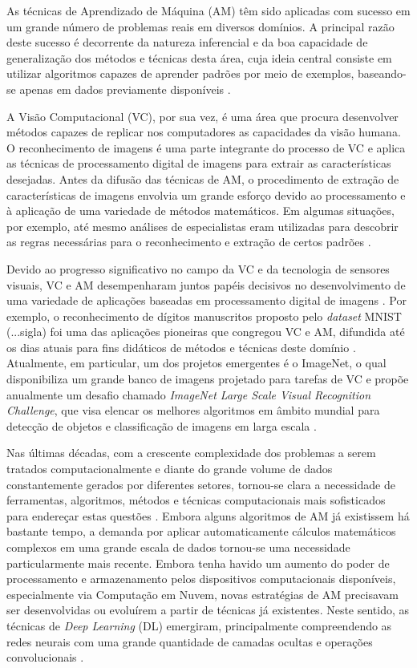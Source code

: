 As técnicas de Aprendizado de Máquina (AM) têm sido aplicadas com sucesso em um grande número de problemas reais em diversos domínios. A principal razão deste sucesso é decorrente da natureza inferencial e da boa capacidade de generalização dos métodos e técnicas desta área, cuja ideia central consiste em utilizar algoritmos capazes de aprender padrões por meio de exemplos, baseando-se apenas em dados previamente disponíveis \cite{ref:faceli,ref:gulli}.

A Visão Computacional (VC), por sua vez, é uma área que procura desenvolver métodos capazes de replicar nos computadores as capacidades da visão humana. O reconhecimento de imagens é uma parte integrante do processo de VC e aplica as técnicas de processamento digital de imagens para extrair as características desejadas. Antes da difusão das técnicas de AM, o procedimento de extração de características de imagens envolvia um grande esforço devido ao processamento e à aplicação de uma variedade de métodos matemáticos. Em algumas situações, por exemplo, até mesmo análises de especialistas eram utilizadas para descobrir as regras necessárias para o reconhecimento e extração de certos padrões \cite{ref:faceli}. 

Devido ao progresso significativo no campo da VC e da tecnologia de sensores visuais, VC e  AM desempenharam juntos papéis decisivos no desenvolvimento de uma variedade de aplicações baseadas em processamento digital de imagens \cite{ref:khan}. Por exemplo, o reconhecimento de dígitos manuscritos proposto pelo \textit{dataset} MNIST (...sigla) foi uma das aplicações pioneiras que congregou VC e AM, difundida até os dias atuais para fins didáticos de métodos e técnicas deste domínio . Atualmente, em particular, um dos projetos emergentes é o ImageNet, o qual disponibiliza um grande banco de imagens projetado para tarefas de VC e propõe anualmente um desafio chamado \emph{ImageNet Large Scale Visual Recognition Challenge}, que visa elencar os melhores algoritmos em âmbito mundial para detecção de objetos e classificação de imagens em larga escala .

Nas últimas décadas, com a crescente complexidade dos problemas a serem tratados computacionalmente e diante do grande volume de dados constantemente gerados por diferentes setores, tornou-se clara a necessidade de ferramentas, algoritmos, métodos e técnicas computacionais mais sofisticados para endereçar estas questões \cite{ref:faceli}. Embora alguns algoritmos de AM já existissem há bastante tempo, a demanda por aplicar automaticamente cálculos matemáticos complexos em uma grande escala de dados tornou-se uma necessidade particularmente mais recente. Embora tenha havido um aumento do poder de processamento e armazenamento pelos dispositivos computacionais disponíveis, especialmente via Computação em Nuvem, novas estratégias de AM precisavam ser desenvolvidas ou evoluírem a partir de técnicas já existentes. Neste sentido, as técnicas de \emph{Deep Learning} (DL) emergiram, principalmente compreendendo as redes neurais com uma grande quantidade de camadas ocultas e operações convolucionais \cite{ref:khan}.


